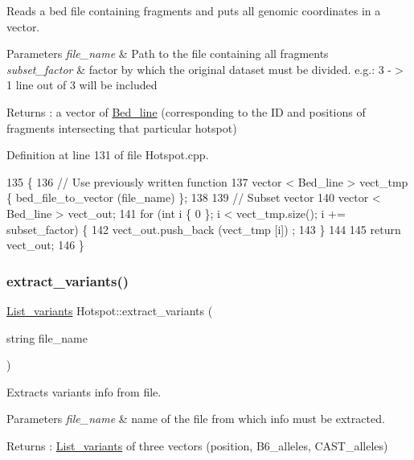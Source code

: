 Reads a bed file containing fragments and puts all genomic coordinates in a vector.


\begin{DoxyParams}{Parameters}
{\em file\+\_\+name} & Path to the file containing all fragments \\
\hline
{\em subset\+\_\+factor} & factor by which the original dataset must be divided. e.\+g.\+: 3 -\/$>$ 1 line out of 3 will be included \\
\hline
\end{DoxyParams}
\begin{DoxyReturn}{Returns}
\+: a vector of \mbox{\hyperlink{struct_bed__line}{Bed\+\_\+line}} (corresponding to the ID and positions of fragments intersecting that particular hotspot) 
\end{DoxyReturn}


Definition at line 131 of file Hotspot.\+cpp.


\begin{DoxyCode}
135 \{
136     \textcolor{comment}{// Use previously written function}
137     vector < Bed\_line > vect\_tmp \{ bed\_file\_to\_vector (file\_name) \};
138 
139     \textcolor{comment}{// Subset vector}
140     vector < Bed\_line > vect\_out;
141     \textcolor{keywordflow}{for} (\textcolor{keywordtype}{int} i \{ 0 \}; i < vect\_tmp.size(); i += subset\_factor) \{
142         vect\_out.push\_back (vect\_tmp [i]) ;
143     \}
144     
145     \textcolor{keywordflow}{return} vect\_out;
146 \}
\end{DoxyCode}
\mbox{\label{class_hotspot_ab8ac666ae3fc8013188070eefae5e1cc}} 
\subsubsection{\texorpdfstring{extract\+\_\+variants()}{extract\_variants()}}
{\footnotesize\ttfamily \mbox{\hyperlink{struct_list__variants}{List\+\_\+variants}} Hotspot\+::extract\+\_\+variants (\begin{DoxyParamCaption}\item[{string}]{file\+\_\+name }\end{DoxyParamCaption})}

Extracts variants info from file.


\begin{DoxyParams}{Parameters}
{\em file\+\_\+name} & name of the file from which info must be extracted. \\
\hline
\end{DoxyParams}
\begin{DoxyReturn}{Returns}
\+: \mbox{\hyperlink{struct_list__variants}{List\+\_\+variants}} of three vectors (position, B6\+\_\+alleles, C\+A\+S\+T\+\_\+alleles) 
\end{DoxyReturn}


